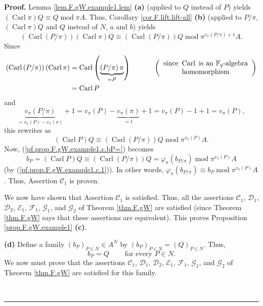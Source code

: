 \documentclass[numbers=enddot,12pt,final,onecolumn,notitlepage]{scrartcl}%
\theoremstyle{definition}
\newenvironment{proof}[1][Proof]{\noindent\textbf{#1.} }{\ \rule{0.5em}{0.5em}}
\begin{document}
\begin{proof}
Lemma \ref{lem.F.gW.example1.lem} \textbf{(a)} (applied to $Q$ instead of $P$)
yields $\left(  \operatorname*{Carl}\pi\right)  Q\equiv Q\operatorname{mod}\pi
A$. Thus, Corollary \ref{cor.F.lift.lift-all} \textbf{(b)} (applied to $P/\pi
$, $\left(  \operatorname*{Carl}\pi\right)  Q$ and $Q$ instead of $N$, $a$ and
$b$) yields%
\[
\left(  \operatorname*{Carl}\left(  P/\pi\right)  \right)  \left(
\operatorname*{Carl}\pi\right)  Q\equiv\left(  \operatorname*{Carl}\left(
P/\pi\right)  \right)  Q\operatorname{mod}\pi^{v_{\pi}\left(  P/\pi\right)
+1}A.
\]
Since%
\begin{align*}
\left(  \operatorname*{Carl}\left(  P/\pi\right)  \right)  \left(
\operatorname*{Carl}\pi\right)   &  =\operatorname*{Carl}\left(
\underbrace{\left(  P/\pi\right)  \pi}_{=P}\right)
\ \ \ \ \ \ \ \ \ \ \left(
\begin{array}
[c]{c}%
\text{since }\operatorname*{Carl}\text{ is an }\mathbb{F}_{q}\text{-algebra}\\
\text{homomorphism}%
\end{array}
\right) \\
&  =\operatorname*{Carl}P
\end{align*}
and
\[
\underbrace{v_{\pi}\left(  P/\pi\right)  }_{=v_{\pi}\left(  P\right)  -v_{\pi
}\left(  \pi\right)  }+1=v_{\pi}\left(  P\right)  -\underbrace{v_{\pi}\left(
\pi\right)  }_{=1}+1=v_{\pi}\left(  P\right)  -1+1=v_{\pi}\left(  P\right)  ,
\]
this rewrites as
\[
\left(  \operatorname*{Carl}P\right)  Q\equiv\left(  \operatorname*{Carl}%
\left(  P/\pi\right)  \right)  Q\operatorname{mod}\pi^{v_{\pi}\left(
P\right)  }A.
\]
Now, (\ref{pf.prop.F.gW.example1.c.bP=}) becomes%
\[
b_{P}=\left(  \operatorname*{Carl}P\right)  Q\equiv\left(
\operatorname*{Carl}\left(  P/\pi\right)  \right)  Q=\varphi_{\pi}\left(
b_{P/\pi}\right)  \operatorname{mod}\pi^{v_{\pi}\left(  P\right)  }A
\]
(by (\ref{pf.prop.F.gW.example1.c.1})). In other words, $\varphi_{\pi}\left(
b_{P/\pi}\right)  \equiv b_{P}\operatorname{mod}\pi^{v_{\pi}\left(  P\right)
}A$. Thus, Assertion $\mathcal{C}_{1}$ is proven.

We now have shown that Assertion $\mathcal{C}_{1}$ is satisfied. Thus, all the
assertions $\mathcal{C}_{1}$, $\mathcal{D}_{1}$, $\mathcal{D}_{2}$,
$\mathcal{E}_{1}$, $\mathcal{F}_{1}$, $\mathcal{G}_{1}$, and $\mathcal{G}_{2}$
of Theorem \ref{thm.F.gW} are satisfied (since Theorem \ref{thm.F.gW} says
that these assertions are equivalent). This proves Proposition
\ref{prop.F.gW.example1} \textbf{(c)}. \medskip

\textbf{(d)} Define a family $\left(  b_{P}\right)  _{P\in N}\in A^{N}$ by
$\left(  b_{P}\right)  _{P\in N}=\left(  Q\right)  _{P\in N}$. Thus,%
\begin{equation}
b_{P}=Q\ \ \ \ \ \ \ \ \ \ \text{for every }P\in N.
\label{pf.prop.F.gW.example1.d.bP=}%
\end{equation}
We now must prove that the assertions $\mathcal{C}_{1}$, $\mathcal{D}_{1}$,
$\mathcal{D}_{2}$, $\mathcal{E}_{1}$, $\mathcal{F}_{1}$, $\mathcal{G}_{1}$,
and $\mathcal{G}_{2}$ of Theorem \ref{thm.F.gW} are satisfied for this family.


\end{proof}
\end{document}
